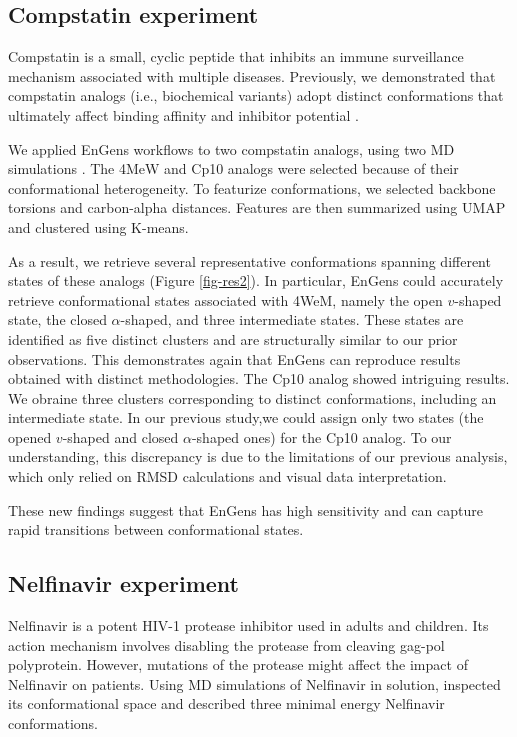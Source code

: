 \documentclass[numsec,webpdf,contemporary,large]{oup-authoring-template}
\theoremstyle{thmstyleone}%
\theoremstyle{thmstyletwo}%
\theoremstyle{thmstylethree}%
\begin{document}
\subsection{Compstatin experiment}

Compstatin is a small, cyclic peptide that inhibits an immune surveillance mechanism associated with multiple diseases. Previously, we demonstrated that compstatin analogs (i.e., biochemical variants) adopt distinct conformations that ultimately affect binding affinity and inhibitor potential \citep{devaurs_computational_2020}. 

We applied EnGens workflows to two compstatin analogs, using two MD simulations \citep{devaurs_computational_2020}. The 4MeW and Cp10 analogs were selected because of their conformational heterogeneity. To featurize conformations, we selected backbone torsions and carbon-alpha distances. Features are then summarized using UMAP and clustered using K-means.

As a result, we retrieve several representative conformations spanning different states of these analogs (Figure \ref{fig-res2}). In particular, EnGens could accurately retrieve conformational states associated with 4WeM, namely the open $v$-shaped state, the closed $\alpha$-shaped, and three intermediate states. These states are identified as five distinct clusters and are structurally similar to our prior observations. This demonstrates again that EnGens can reproduce results obtained with distinct methodologies. The Cp10 analog showed intriguing results. We obraine three clusters corresponding to distinct conformations, including an intermediate state. In our previous study,we could assign only two states (the opened $v$-shaped  and closed $\alpha$-shaped ones) for the Cp10 analog. To our understanding, this discrepancy is due to the limitations of our previous analysis, which only relied on RMSD calculations and visual data interpretation.

These new findings suggest that EnGens has high sensitivity and can capture rapid transitions between conformational states.

\subsection{Nelfinavir experiment}
 
Nelfinavir is a potent HIV-1 protease inhibitor used in adults and children. Its action mechanism involves disabling the protease from cleaving gag-pol polyprotein. However, mutations of the protease might affect the impact of Nelfinavir on patients. Using MD simulations of Nelfinavir in solution, \cite{antunes_new_2014} inspected its conformational space and described three minimal energy Nelfinavir conformations.
\end{document}
